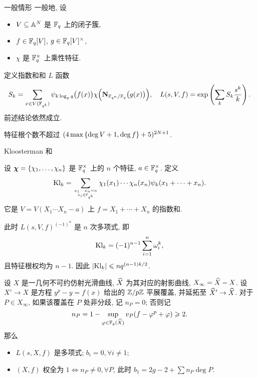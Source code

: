\documentclass[aspectratio=169,handout]{ctexbeamer}
\renewcommand\emph[1]{{\color{structure.fg!50!blue}{#1}}}
\newcommand\bchi{{\boldsymbol\chi}}
\begin{document}
\begin{frame}{一般情形}
一般地, 设
\begin{itemize}
\item $V\subseteq {\mathbb{A}}^N$ 是 ${\mathbb{F}}_q$ 上的闭子簇,
\item $f\in {\mathbb{F}}_q[V]$, $g\in{\mathbb{F}}_q[V]^\times$,
\item $\chi$ 是 ${\mathbb{F}}_q^\times$ 上乘性特征.
\end{itemize}
定义指数和和 $L$ 函数
	\[S_k=\sum_{x\in V({\mathbb{F}}_{q^k})}\psi_{k\log_p q}\bigl(f(x)\bigr)\chi\Bigl({\mathbf{N}}_{{\mathbb{F}}_{q^n}/{\mathbb{F}}_q}\bigl(g(x)\bigr)\Bigr),\quad
	L(s,V,f)=\exp\left(\sum_k S_k\frac{s^k}k\right).\]
前述结论依然成立.
\begin{theorem}[Bombieri1978]
特征根个数不超过 $(4\max{\left\{\deg V+1,\deg f\right\}}+5)^{2N+1}$.
\end{theorem}
\end{frame}


\begin{frame}{Kloosterman 和}

\begin{example}
设 $\bchi=\set{\chi_1,\dots,\chi_n}$ 是 ${\mathbb{F}}_q^\times$ 上的 $n$ 个特征, $a\in{\mathbb{F}}_q^\times$.
定义 \emph{Kloosterman 和}
	\[{\mathrm{Kl}}_k=\sum_{x_1\cdots x_n=a\atop x_i\in{\mathbb{F}}_{q^k}}\chi_1(x_1)\cdots\chi_n(x_n)\psi_k(x_1+\cdots+x_n).\]
它是 $V=V(X_1\cdots X_n-a)$ 上 $f=X_1+\cdots+X_n$ 的指数和.

此时 $L(s,V,f)^{(-1)^n}$ 是 $n$ 次多项式, 即
\[{\mathrm{Kl}}_k=(-1)^{n-1}\sum_{i=1}^n \omega_i^k,\]
且特征根权均为 $n-1$.
因此 $|{\mathrm{Kl}}_k|\leqslant nq^{(n-1)k/2}$.
\end{example}
\end{frame}


\begin{frame}
\begin{example}[Serre1977]
设 $X$ 是一几何不可约仿射光滑曲线, $\widehat X$ 为其对应的射影曲线, $X_\infty=\widehat X-X$.
设 $X'\to X$ 是方程 $y^p-y=f(x)$ 给出的 ${\mathbb{Z}}/p{\mathbb{Z}}$ 平展覆盖, 并延拓至 $\widehat X'\to \widehat X$.
对于 $P\in X_\infty$, 如果该覆盖在 $P$ 处非分歧, 记 $n_P=0$; 否则记
\[n_P=1-\sup_{\varphi\in{\mathbb{F}}_q(\widehat X)} v_P(f-\varphi^p+\varphi)\geqslant 2.\]
那么
\begin{itemize}
	\item $L(s,X,f)$ 是多项式; $b_i=0, \forall i\neq 1$;
	\item $(X,f)$ 权全为 $1 \iff n_P\neq 0,\forall P$, 此时 $b_1=2g-2+\sum n_P\deg P$.
\end{itemize}
\end{example}
\end{frame}
	
\end{document}

